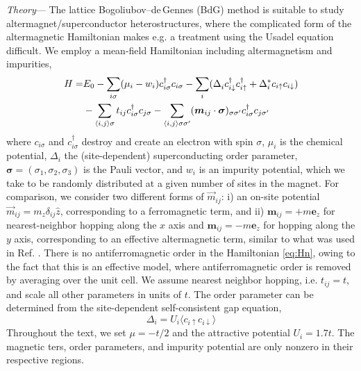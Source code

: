 \documentclass[aps,twocolumn,amsmath,amssymb,preprintnumbers,floatfix,prl,superscriptaddress,longbibliography]{revtex4-2}%
\begin{document}
\textit{Theory}---
The lattice Bogoliubov--de\,Gennes (BdG) method \cite{zhu2016, degennes1966} is suitable to study altermagnet/superconductor heterostructures, where the complicated form of the altermagnetic Hamiltonian makes e.g. a treatment using the Usadel equation difficult. 
We employ a mean-field Hamiltonian including altermagnetism and impurities,
\begin{equation}
\label{eq:Hn}
    \begin{split}
        H =&  E_0
		- \sum_{i\sigma} (\mu_i - w_i) c^\dag_{i\sigma} c_{i\sigma}
  - \sum_i (\Delta_i^{\vphantom{*}} c^\dag_{i\downarrow} c^\dag_{i\uparrow} 
    + \Delta_i^* c_{i\uparrow} c_{i\downarrow}) 
    \\& 
		- \sum_{\langle i, j \rangle \sigma} t_{ij} c^\dag_{i\sigma} c_{j\sigma}
		- \sum_{\langle i, j \rangle \sigma\sigma'} (\bm{m}_{ij} \cdot \bm{\sigma})_{\sigma\sigma'} c^\dag_{i\sigma} c_{j\sigma'}
    \end{split}
\end{equation}
where $c_{i\sigma}$ and $c^\dag_{i\sigma}$  destroy and create an electron with spin $\sigma$, $\mu_i$ is the chemical potential, $\Delta_i$ the (site-dependent) superconducting order parameter, $\bm{\sigma} = (\sigma_1, \sigma_2, \sigma_3)$ is the Pauli vector, and $w_i$ is an impurity potential, which we take to be randomly distributed at a given number of sites in the magnet.
For comparison, we consider two different forms of $\vec m_{ij}$: i) an on-site potential $\vec m_{ij} = m_z \delta_{ij} \hat z $, corresponding to a ferromagnetic term, and ii) $\bm{m}_{ij} = +m\bm{e}_z$ for nearest-neighbor hopping along the $x$ axis and $\bm{m}_{ij} = -m\bm{e}_z$ for hopping along the $y$ axis, corresponding to an effective altermagnetic term, similar to what was used in Ref. . There is no antiferromagnetic order in the Hamiltonian \eqref{eq:Hn}, owing to the fact that this is an effective model, where antiferromagnetic order is removed by averaging over the unit cell.
We assume nearest neighbor hopping, i.e. $t_{ij} = t$, and scale all other parameters in units of $t$.
The order parameter can be determined from the site-dependent self-consistent gap equation,
\begin{equation}
    \label{eq:gapeeq}
    \Delta_i = U_i \langle c_{i \uparrow} c_{i \downarrow} \rangle
\end{equation}
Throughout the text, we set $\mu = -t/2$ and the attractive potential $U_i = 1.7t$.
The magnetic ters, order parameters, and impurity potential are only nonzero in their respective regions.
\end{document}
